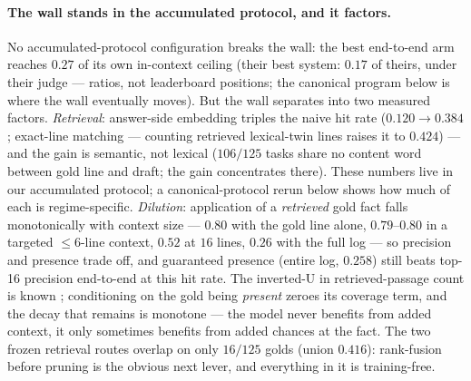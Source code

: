 \documentclass[11pt]{article}
\begin{document}
\paragraph{The wall stands in the accumulated protocol, and it factors.} No accumulated-protocol
configuration breaks the wall: the best
end-to-end arm reaches $0.27$ of its own in-context ceiling (their best system: $0.17$ of
theirs, under their judge --- ratios, not leaderboard positions; the canonical program
below is where the wall eventually moves). But the wall separates into two measured factors. \emph{Retrieval}: answer-side
embedding triples the naive hit rate ($0.120 \to 0.384$; exact-line matching --- counting
retrieved lexical-twin lines raises it to $0.424$) --- and the gain is semantic, not
lexical ($106/125$ tasks share no content word between gold line and draft; the gain
concentrates there). These numbers live in our accumulated protocol; a canonical-protocol rerun below shows how
much of each is regime-specific. \emph{Dilution}: application of a
\emph{retrieved} gold fact falls monotonically with context size --- $0.80$ with the gold line
alone, $0.79$--$0.80$ in a targeted $\le 6$-line context, $0.52$ at $16$ lines, $0.26$ with
the full log --- so precision and presence trade off, and guaranteed presence (entire log,
$0.258$) still beats top-16 precision end-to-end at this hit rate. The inverted-U in
retrieved-passage count is known \citep{jin2025longrag,cuconasu2024noise}; conditioning on
the gold being \emph{present} zeroes its coverage term, and the decay that remains is
monotone --- the model never benefits from added context, it only sometimes benefits from
added chances at the fact. The two frozen retrieval
routes overlap on only $16/125$ golds (union $0.416$): rank-fusion before pruning is the
obvious next lever, and everything in it is training-free.
\end{document}
